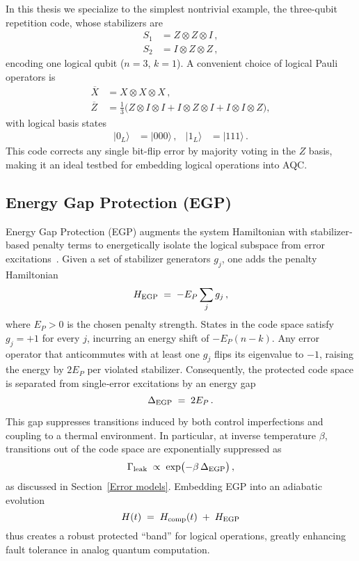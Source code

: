 \documentclass[reprint, amsmath,amssymb,nofootinbib, aps,superscriptaddress,longbibliography]{revtex4-1}
\begin{document}
In this thesis we specialize to the simplest nontrivial example, the three-qubit repetition code, whose stabilizers are
\begin{align}
S_1 &= Z\otimes Z\otimes I\,, \\
S_2 &= I\otimes Z\otimes Z\,,
\end{align}
encoding one logical qubit (\(n=3\), \(k=1\)).  A convenient choice of logical Pauli operators is
\begin{align}
\overline{X} &= X\otimes X\otimes X\,, \\
\overline{Z} &= \tfrac{1}{3}\bigl(Z\otimes I\otimes I + I\otimes Z\otimes I + I\otimes I\otimes Z\bigr),
\end{align}
with logical basis states
\begin{align}
|0_L\rangle &= |000\rangle\,, & |1_L\rangle &= |111\rangle\,. 
\end{align}
This code corrects any single bit-flip error by majority voting in the \(Z\) basis, making it an ideal testbed for embedding logical operations into AQC.  

\subsection{Energy Gap Protection (EGP)}

Energy Gap Protection (EGP) augments the system Hamiltonian with stabilizer‐based penalty terms to energetically isolate the logical subspace from error excitations~\cite{jordan2006error}.  Given a set of stabilizer generators \(g_j\), one adds the penalty Hamiltonian
\begin{equation}
H_{\rm EGP} \;=\; -E_P \sum_j g_j \,,
\end{equation}
where \(E_P>0\) is the chosen penalty strength.  States in the code space satisfy \(g_j=+1\) for every \(j\), incurring an energy shift of \(-E_P(n-k)\).  Any error operator that anticommutes with at least one \(g_j\) flips its eigenvalue to \(-1\), raising the energy by \(2E_P\) per violated stabilizer.  Consequently, the protected code space is separated from single‐error excitations by an energy gap
\begin{equation}
\Delta_{\rm EGP} \;=\; 2E_P \,.
\end{equation}

This gap suppresses transitions induced by both control imperfections and coupling to a thermal environment.  In particular, at inverse temperature \(\beta\), transitions out of the code space are exponentially suppressed as
\[
\Gamma_{\rm leak}\;\propto\;\exp\bigl(-\beta\,\Delta_{\rm EGP}\bigr)\,,
\]
as discussed in Section~\ref{Error models}.  Embedding EGP into an adiabatic evolution
\[
H(t) \;=\; H_{\rm comp}(t) \;+\; H_{\rm EGP}
\]
thus creates a robust protected “band” for logical operations, greatly enhancing fault tolerance in analog quantum computation.  
\end{document}
